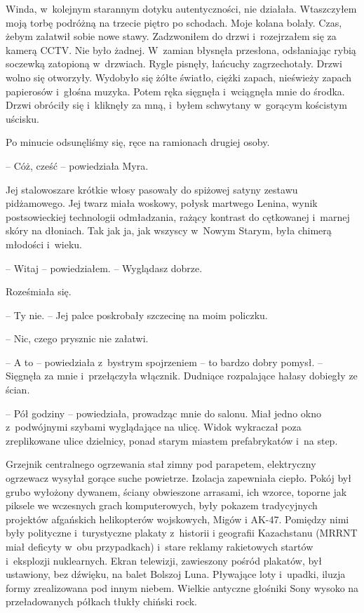 \documentclass[oneside,polish,11pt,sfheadings]{mwbk}
\begin{document}
Winda, w~kolejnym starannym dotyku autentyczności, nie działała.
Wtaszczyłem moją torbę podróżną na trzecie piętro po schodach. Moje
kolana bolały. Czas, żebym załatwił sobie nowe stawy. Zadzwoniłem do
drzwi i~rozejrzałem się za kamerą CCTV. Nie było żadnej. W~zamian
błysnęła przesłona, odsłaniając rybią soczewką zatopioną w~drzwiach.
Rygle pisnęły, łańcuchy zagrzechotały. Drzwi wolno się otworzyły.
Wydobyło się żółte światło, ciężki zapach, nieświeży zapach papierosów i~głośna muzyka. Potem ręka sięgnęła i~wciągnęła mnie do środka. Drzwi
obróciły się i~kliknęły za mną, i~byłem schwytany w~gorącym kościstym
uścisku.

Po minucie odsunęliśmy się, ręce na ramionach drugiej osoby.

-- Cóż, cześć -- powiedziała Myra.

Jej stalowoszare krótkie włosy pasowały do spiżowej satyny zestawu
pidżamowego. Jej twarz miała woskowy, połysk martwego Lenina, wynik
postsowieckiej technologii odmładzania, rażący kontrast do cętkowanej i~marnej skóry na dłoniach. Tak jak ja, jak wszyscy w~Nowym Starym, była
chimerą młodości i~wieku.

-- Witaj -- powiedziałem. -- Wyglądasz dobrze.

Roześmiała się. 

-- Ty nie. -- Jej palce poskrobały szczecinę na moim
policzku.

-- Nic, czego prysznic nie załatwi.

-- A to -- powiedziała z~bystrym spojrzeniem -- to bardzo dobry pomysł. -- Sięgnęła za mnie i~przełączyła włącznik. Dudniące rozpalające hałasy
dobiegły ze ścian. 

-- Pół godziny -- powiedziała, prowadząc mnie do
salonu. Miał jedno okno z~podwójnymi szybami wyglądające na ulicę. Widok
wykraczał poza zreplikowane ulice dzielnicy, ponad starym miastem
prefabrykatów i~na step.

Grzejnik centralnego ogrzewania stał zimny pod parapetem, elektryczny
ogrzewacz wysyłał gorące suche powietrze. Izolacja zapewniała ciepło.
Pokój był grubo wyłożony dywanem, ściany obwieszone arrasami, ich
wzorce, toporne jak piksele we wczesnych grach komputerowych, były
pokazem tradycyjnych projektów afgańskich helikopterów wojskowych, Migów
i AK-47. Pomiędzy nimi były polityczne i~turystyczne plakaty z~historii
i geografii Kazachstanu (MRRNT miał deficyty w~obu przypadkach) i~stare
reklamy rakietowych startów i~eksplozji nuklearnych. Ekran telewizji,
zawieszony pośród plakatów, był ustawiony, bez dźwięku, na balet Bolszoj
Luna. Pływające loty i~upadki, iluzja formy zrealizowana pod innym
niebem. Wielkie antyczne głośniki Sony wysoko na przeładowanych półkach
tłukły chiński rock.
\end{document}
